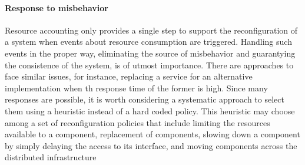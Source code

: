 \paragraph{Response to misbehavior}


Resource accounting only provides a single step to support the reconfiguration of a system when events about resource consumption are triggered.
Handling such events in the proper way, eliminating the source of misbehavior and guarantying the consistence of the system, is of utmost importance.
There are approaches to face similar issues, for instance, replacing a service for an alternative implementation when th response time of the former is high.
Since many responses are possible, it is worth considering a systematic approach to select them using a heuristic instead of a hard coded policy.
This heuristic may choose among a set of reconfiguration policies that include limiting the resources available to a component, replacement of components, slowing down a component by simply delaying the access to its interface, and moving components across the distributed infrastructure


